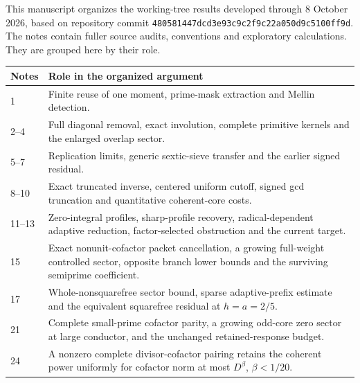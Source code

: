 \documentclass[11pt]{article}
\numberwithin{equation}{section}
\theoremstyle{definition}
\theoremstyle{remark}
\begin{document}
This manuscript organizes the working-tree results developed through
8 October 2026, based on repository commit
\texttt{480581447dcd3e93c9c2f9c22a050d9c5100ff9d}.
The notes contain fuller source audits, conventions and exploratory
calculations. They are grouped here by their role.

\begin{center}\small
\begin{tabular}{@{}p{}p{}@{}}
\toprule
Notes & Role in the organized argument\\
\midrule
1 & Finite reuse of one moment, prime-mask extraction and Mellin detection.\\
2--4 & Full diagonal removal, exact involution, complete primitive kernels
and the enlarged overlap sector.\\
5--7 & Replication limits, generic sextic-sieve transfer and the earlier
signed residual.\\
8--10 & Exact truncated inverse, centered uniform cutoff, signed gcd
truncation and quantitative coherent-core costs.\\
11--13 & Zero-integral profiles, sharp-profile recovery, radical-dependent
adaptive reduction, factor-selected obstruction and the current target.\\
15 & Exact nonunit-cofactor packet cancellation, a growing full-weight
controlled sector, opposite branch lower bounds and the surviving
semiprime coefficient.\\
17 & Whole-nonsquarefree sector bound, sparse adaptive-prefix estimate
and the equivalent squarefree residual at \(h=a=2/5\).\\
21 & Complete small-prime cofactor parity, a growing odd-core zero sector
at large conductor, and the unchanged retained-response budget.\\
24 & A nonzero complete divisor-cofactor pairing retains the coherent
power uniformly for cofactor norm at most \(D^\beta\), \(\beta<1/20\).\\
\bottomrule
\end{tabular}
\end{center}
\end{document}
